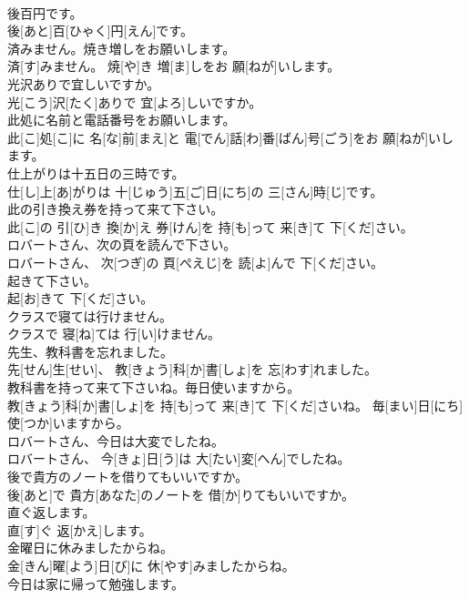 \documentclass[8pt]{extreport}
\begin{document}
\begin{CJK}{UTF8}{min}
\\	後百円です。	
\\	後[あと]百[ひゃく]円[えん]です。
\\	済みません。焼き増しをお願いします。	
\\	済[す]みません。 焼[や]き 増[ま]しをお 願[ねが]いします。
\\	光沢ありで宜しいですか。	
\\	光[こう]沢[たく]ありで 宜[よろ]しいですか。
\\	此処に名前と電話番号をお願いします。	
\\	此[こ]処[こ]に 名[な]前[まえ]と 電[でん]話[わ]番[ばん]号[ごう]をお 願[ねが]いします。
\\	仕上がりは十五日の三時です。	
\\	仕[し]上[あ]がりは 十[じゅう]五[ご]日[にち]の 三[さん]時[じ]です。
\\	此の引き換え券を持って来て下さい。	
\\	此[こ]の 引[ひ]き 換[か]え 券[けん]を 持[も]って 来[き]て 下[くだ]さい。
\\	ロバートさん、次の頁を読んで下さい。	
\\	ロバートさん、 次[つぎ]の 頁[ぺえじ]を 読[よ]んで 下[くだ]さい。
\\	起きて下さい。	
\\	起[お]きて 下[くだ]さい。
\\	クラスで寝ては行けません。	
\\	クラスで 寝[ね]ては 行[い]けません。
\\	先生、教科書を忘れました。	
\\	先[せん]生[せい]、 教[きょう]科[か]書[しょ]を 忘[わす]れました。
\\	教科書を持って来て下さいね。毎日使いますから。	
\\	教[きょう]科[か]書[しょ]を 持[も]って 来[き]て 下[くだ]さいね。 毎[まい]日[にち]使[つか]いますから。
\\	ロバートさん、今日は大変でしたね。	
\\	ロバートさん、 今[きょ]日[う]は 大[たい]変[へん]でしたね。
\\	後で貴方のノートを借りてもいいですか。	
\\	後[あと]で 貴方[あなた]のノートを 借[か]りてもいいですか。
\\	直ぐ返します。	
\\	直[す]ぐ 返[かえ]します。
\\	金曜日に休みましたからね。	
\\	金[きん]曜[よう]日[び]に 休[やす]みましたからね。
\\	今日は家に帰って勉強します。	

\end{CJK}
\end{document}
